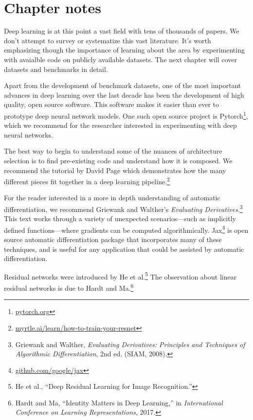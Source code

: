 \documentclass{tufte-book}
\begin{document}
\hypertarget{chapter-notes-6}{%
\section{Chapter notes}\label{chapter-notes-6}}

Deep learning is at this point a vast field with tens of thousands of
papers. We don't attempt to survey or systematize this vast literature.
It's worth emphasizing though the importance of learning about the area
by experimenting with avaialble code on publicly available datasets. The
next chapter will cover datasets and benchmarks in detail.

Apart from the development of benchmark datasets, one of the most
important advances in deep learning over the last decade has been the
development of high quality, open source software. This software makes
it easier than ever to prototype deep neural network models. One such
open source project is Pytorch\footnote{\href{https://pytorch.org/}{pytorch.org}},
which we recommend for the researcher interested in experimenting with
deep neural networks.

The best way to begin to understand some of the nuances of architecture
selection is to find pre-existing code and understand how it is
composed. We recommend the tutorial by David Page which demonstrates how
the many different pieces fit together in a deep learning
pipeline.\footnote{\href{https://myrtle.ai/learn/how-to-train-your-resnet/}{myrtle.ai/learn/how-to-train-your-resnet}}

For the reader interested in a more in depth understanding of automatic
differentiation, we recommend Griewank and Walther's \emph{Evaluating
Derivatives}.\footnote{Griewank and Walther, \emph{Evaluating
  Derivatives: Principles and Techniques of Algorithmic
  Differentiation}, 2nd ed. (SIAM, 2008).} This text works through a
variety of unexpected scenarios---such as implicitly defined
functions---where gradients can be computed algorithmically.
Jax\footnote{\href{https://github.com/google/jax}{github.com/google/jax}}
is open source automatic differentiation package that incorporates many
of these techniques, and is useful for any application that could be
assisted by automatic differentiation.

Residual networks were introduced by He et al.\footnote{He et al.,
  {``Deep Residual Learning for Image Recognition.''}} The observation
about linear residual networks is due to Hardt and Ma.\footnote{Hardt
  and Ma, {``Identity Matters in Deep Learning,''} in
  \emph{International Conference on Learning Representations}, 2017.}
\end{document}
